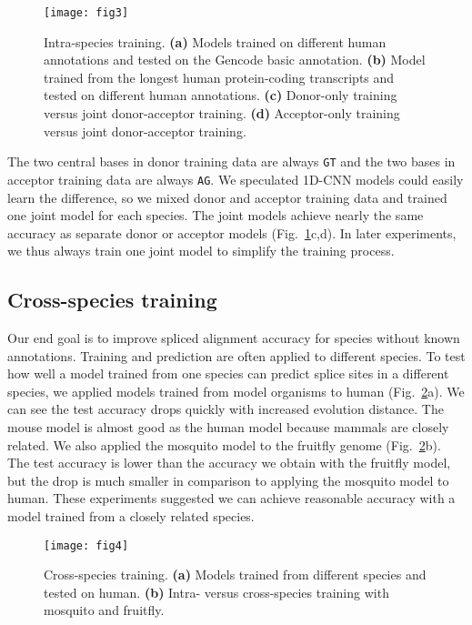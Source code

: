 \documentclass[webpdf,contemporary,large,namedate]{oup-authoring-template}%
\begin{document}
\begin{figure}[tb]
\texttt{[image: fig3]}
\caption{Intra-species training.
{\bf (a)} Models trained on different human annotations
and tested on the Gencode basic annotation.
{\bf (b)} Model trained from the longest human protein-coding transcripts
and tested on different human annotations.
{\bf (c)} Donor-only training versus joint donor-acceptor training.
{\bf (d)} Acceptor-only training versus joint donor-acceptor training.}\label{fig:3}
\end{figure}

The two central bases in donor training data are always {\tt GT}
and the two bases in acceptor training data are always {\tt AG}.
We speculated 1D-CNN models could easily learn the difference, so we mixed donor and acceptor training data
and trained one joint model for each species.
The joint models achieve nearly the same accuracy as separate donor or acceptor models (Fig.~\ref{fig:3}c,d).
In later experiments, we thus always train one joint model to simplify the training process.

\subsection{Cross-species training}

Our end goal is to improve spliced alignment accuracy for species without known annotations.
Training and prediction are often applied to different species.
To test how well a model trained from one species can predict splice sites in a different species,
we applied models trained from model organisms to human (Fig.~\ref{fig:4}a).
We can see the test accuracy drops quickly with increased evolution distance.
The mouse model is almost good as the human model because mammals are closely related.
We also applied the mosquito model to the fruitfly genome (Fig.~\ref{fig:4}b).
The test accuracy is lower than the accuracy we obtain with the fruitfly model,
but the drop is much smaller in comparison to applying the mosquito model to human.
These experiments suggested we can achieve reasonable accuracy with a model trained from a closely related species.

\begin{figure}[bt]
\texttt{[image: fig4]}
\caption{Cross-species training.
{\bf (a)} Models trained from different species and tested on human.
{\bf (b)} Intra- versus cross-species training with mosquito and fruitfly.}\label{fig:4}
\end{figure}
\end{document}
